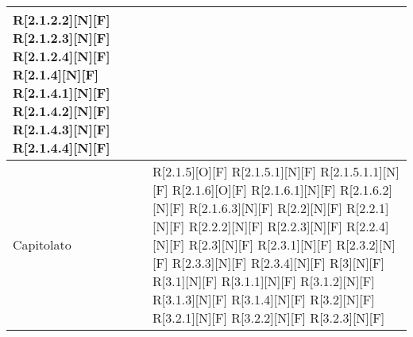 \begin{longtable}{X | X}
		R[2.1.2.2][N][F]       \newline
		R[2.1.2.3][N][F]       \newline
		R[2.1.2.4][N][F]       \newline
		R[2.1.4][N][F]         \newline
		R[2.1.4.1][N][F]       \newline
		R[2.1.4.2][N][F]       \newline
		R[2.1.4.3][N][F]       \newline
		R[2.1.4.4][N][F]       \\ \hline
		Capitolato &
		R[2.1.5][O][F]         \newline
		R[2.1.5.1][N][F]       \newline
		R[2.1.5.1.1][N][F]	 \newline    
		R[2.1.6][O][F]         \newline
		R[2.1.6.1][N][F]       \newline
		R[2.1.6.2][N][F]       \newline
		R[2.1.6.3][N][F]       \newline
		R[2.2][N][F]           \newline
		R[2.2.1][N][F]         \newline
		R[2.2.2][N][F]         \newline
		R[2.2.3][N][F]         \newline
		R[2.2.4][N][F]         \newline
		R[2.3][N][F]           \newline
		R[2.3.1][N][F]         \newline
		R[2.3.2][N][F]         \newline
		R[2.3.3][N][F]         \newline
		R[2.3.4][N][F]         \newline
		R[3][N][F]             \newline
		R[3.1][N][F]	         \newline
		R[3.1.1][N][F]         \newline
		R[3.1.2][N][F]         \newline
		R[3.1.3][N][F]         \newline
		R[3.1.4][N][F]	     \newline
		R[3.2][N][F]           \newline
		R[3.2.1][N][F]         \newline
		R[3.2.2][N][F]         \newline
		R[3.2.3][N][F]         \newline

\end{longtable}
